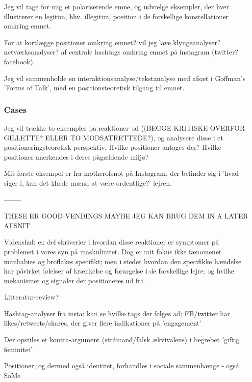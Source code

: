 Jeg vil tage for mig et polariserende emne, og udvœlge eksempler, der hver
illustrerer en legitim, hhv. illegitim, position i de forskellige
konstellationer omkring emnet.

For at kortlægge positioner omkring emnet? vil jeg lave klyngeanalyser?
netværksanalyser? af centrale hashtags omkring emnet på instagram (twitter?
facebook).

Jeg vil sammenholde en interaktionsanalyse/tekstanalyse med afsæt i Goffman's
'Forms of Talk', med en positionsteoretisk tilgang til emnet.


\subsubsection{Cases}

Jeg vil trække to eksempler på reaktioner ud ((BEGGE KRITISKE OVERFOR GILLETTE?
ELLER TO MODSATRETTEDE?), og analysere disse i et positioneringsteoretisk
perspektiv.  Hvilke positioner antages der? Hvilke positioner anerkendes i
deres pågældende miljø?

Mit første eksempel er fra motherofsnot på Instagram, der befinder sig i 'hvad
siger i, kan det klæde mænd at være ordentlige?' lejren.

—-----

THESE ER GOOD VENDINGS MAYBE JEG KAN BRUG DEM IN A LATER AFSNIT

Videnshul: en del skriverier i hvordan disse reaktioner er symptomer på
problemet i vores syn på maskulinitet. Dog er mit fokus ikke fænomenet
manbabies og broflakes specifikt; men i stedet hvordan den specifikke hændelse
har påvirket følelser af krænkelse og forargelse i de forskellige lejre; og
hvilke mekanismer og signaler der positioneres ud fra.

Litteratur-review?

Hashtag-analyser fra insta: kan se hvilke tags der følges ad; FB/twitter har
likes/retweets/shares, der giver flere indikationer på 'engagement'

Der opstiles et kontra-argument (stråmand/falsk ækvivalens) i begrebet 'giftig
feminitet'

Positioner, og dermed også identitet, forhandles i sociale sammenhænge - også
SoMe


